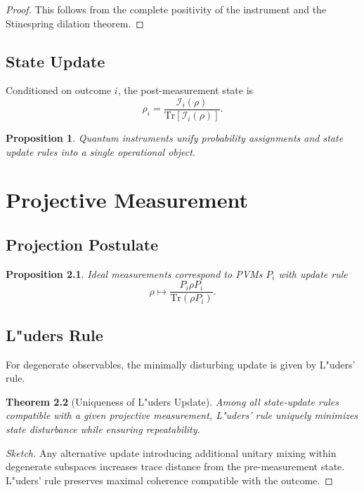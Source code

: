 \documentclass[12pt]{book}
\theoremstyle{plain}
\newtheorem{theorem}{Theorem}[chapter]
\newtheorem{proposition}[theorem]{Proposition}
\theoremstyle{definition}
\theoremstyle{remark}
\begin{document}
\begin{proof}
This follows from the complete positivity of the instrument and the Stinespring dilation theorem.
\end{proof}

\section{State Update}
Conditioned on outcome $i$, the post-measurement state is
\[
\rho_i = \frac{\mathcal{I}_i(\rho)}{\mathrm{Tr}[\mathcal{I}_i(\rho)]}.
\]

\begin{proposition}
Quantum instruments unify probability assignments and state update rules into a single operational object.
\end{proposition}

\chapter{Projective Measurement}

\section{Projection Postulate}

\begin{proposition}
Ideal measurements correspond to PVMs ${P_i}$ with update rule
\[
\rho \mapsto \frac{P_i \rho P_i}{\mathrm{Tr}(\rho P_i)}.
\]
\end{proposition}

\section{L"uders Rule}
For degenerate observables, the minimally disturbing update is given by L"uders' rule.

\begin{theorem}[Uniqueness of L"uders Update]
Among all state-update rules compatible with a given projective measurement, L"uders' rule uniquely minimizes state disturbance while ensuring repeatability.
\end{theorem}

\begin{proof}[Sketch]
Any alternative update introducing additional unitary mixing within degenerate subspaces increases trace distance from the pre-measurement state. L"uders' rule preserves maximal coherence compatible with the outcome.
\end{proof}
\end{document}
